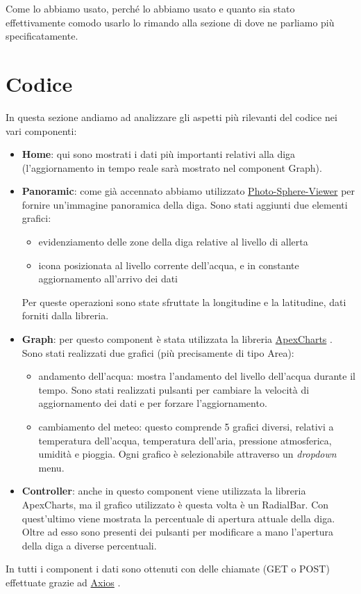 \documentclass[a4paper,12pt]{report}
\newcommand{\apexcharts}{\href{https://apexcharts.com/}{ApexCharts} }
\newcommand{\axios}{\href{https://axios-http.com/}{Axios} }
\newcommand{\photosphereviewer}{\href{https://photo-sphere-viewer.js.org/}{Photo-Sphere-Viewer} }
\begin{document}
Come lo abbiamo usato, perché lo abbiamo usato e quanto sia stato effettivamente comodo usarlo lo rimando alla sezione di  dove ne parliamo più specificatamente.

\clearpage
\chapter{Codice}\label{sec:code}
In questa sezione andiamo ad analizzare gli aspetti più rilevanti del codice nei vari componenti:
\begin{itemize}
    \item \textbf{Home}: qui sono mostrati i dati più importanti relativi alla diga (l'aggiornamento in tempo reale sarà mostrato nel component Graph).
	\item \textbf{Panoramic}: come già accennato abbiamo utilizzato \photosphereviewer per fornire un'immagine panoramica della diga. Sono stati aggiunti due elementi grafici:
    	\begin{itemize}
    	    \item evidenziamento delle zone della diga relative al livello di allerta
    	    \item icona posizionata al livello corrente dell'acqua, e in constante aggiornamento all'arrivo dei dati
    	\end{itemize}
	Per queste operazioni sono state sfruttate la longitudine e la latitudine, dati forniti dalla libreria.
	\item \textbf{Graph}: per questo component è stata utilizzata la libreria \apexcharts. Sono stati realizzati due grafici (più precisamente di tipo Area):
	\begin{itemize}
	    \item andamento dell'acqua: mostra l'andamento del livello dell'acqua durante il tempo. Sono stati realizzati pulsanti per cambiare la velocità di aggiornamento dei dati e per forzare l'aggiornamento.
	    \item cambiamento del meteo: questo comprende 5 grafici diversi, relativi a temperatura dell'acqua, temperatura dell'aria, pressione atmosferica, umidità e pioggia. Ogni grafico è selezionabile attraverso un \emph{dropdown} menu.
	\end{itemize}
	\item \textbf{Controller}: anche in questo component viene utilizzata la libreria ApexCharts, ma il grafico utilizzato è questa volta è un RadialBar. Con quest'ultimo viene mostrata la percentuale di apertura attuale della diga. Oltre ad esso sono presenti dei pulsanti per modificare a mano l'apertura della diga a diverse percentuali.
\end{itemize}
In tutti i component i dati sono ottenuti con delle chiamate (GET o POST) effettuate grazie ad \axios.
\end{document}
